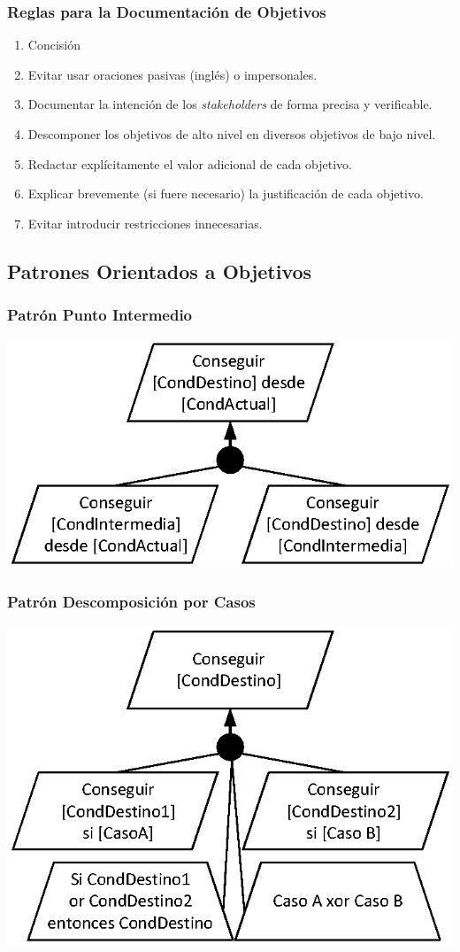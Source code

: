 \documentclass[handout,slidestop,xcolor=pst,dvips,blue]{beamer}
\begin{document}
\begin{frame}[c]
    \frametitle{Reglas para la Documentación de Objetivos}
    \begin{enumerate}[<+->]
        \item Concisión
        \item Evitar usar oraciones pasivas (inglés) o impersonales.
        \item Documentar la intención de los \emph{stakeholders} de forma precisa y verificable.
        \item Descomponer los objetivos de alto nivel en diversos objetivos de bajo nivel.
        \item Redactar explícitamente el valor adicional de cada objetivo.
        \item Explicar brevemente (si fuere necesario) la justificación de cada objetivo.
        \item Evitar introducir restricciones innecesarias.
    \end{enumerate}
\end{frame}

\subsection{Patrones Orientados a Objetivos}

\begin{frame}[c]
    \frametitle{Patrón Punto Intermedio}
    \begin{center}
        \includegraphics[width=0.70\linewidth,keepaspectratio=true]{images/objetivos/milestonePattern.eps}
    \end{center}
\end{frame}

\begin{frame}[c]
    \frametitle{Patrón Descomposición por Casos}
    \begin{center}
        \includegraphics[width=0.70\linewidth,keepaspectratio=true]{images/objetivos/casePattern.eps}
    \end{center}
\end{frame}
\end{document}
